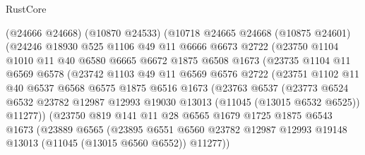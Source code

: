 \begin{lexlean}{RustCore}
\begin{coremodule}
              (@24666 @24668)
              (@10870 @24533)
              (@10718
                @24665
                @24668
                (@10875 @24601)
                (@24246
                  @18930
                  @525
                  @1106
                  @49
                  @11
                  @6666
                  @6673
                  @2722
                  (@23750
                    @1104
                    @1010
                    @11
                    @40
                    @6580
                    @6665
                    @6672
                    @1875
                    @6508
                    @1673
                    (@23735
                      @1104
                      @11
                      @6569
                      @6578
                      (@23742
                        @1103
                        @49
                        @11
                        @6569
                        @6576
                        @2722
                        (@23751
                          @1102
                          @11
                          @40
                          @6537
                          @6568
                          @6575
                          @1875
                          @6516
                          @1673
                          (@23763
                            @6537
                            (@23773
                              @6524
                              @6532
                              @23782
                              @12987
                              @12993
                              @19030
                              @13013
                              (@11045 (@13015 @6532 @6525))
                              @11277))
                          (@23750
                            @819
                            @141
                            @11
                            @28
                            @6565
                            @1679
                            @1725
                            @1875
                            @6543
                            @1673
                            (@23889
                              @6565
                              (@23895
                                @6551
                                @6560
                                @23782
                                @12987
                                @12993
                                @19148
                                @13013
                                (@11045 (@13015 @6560 @6552))
                                @11277))

\end{coremodule}
\end{lexlean}
